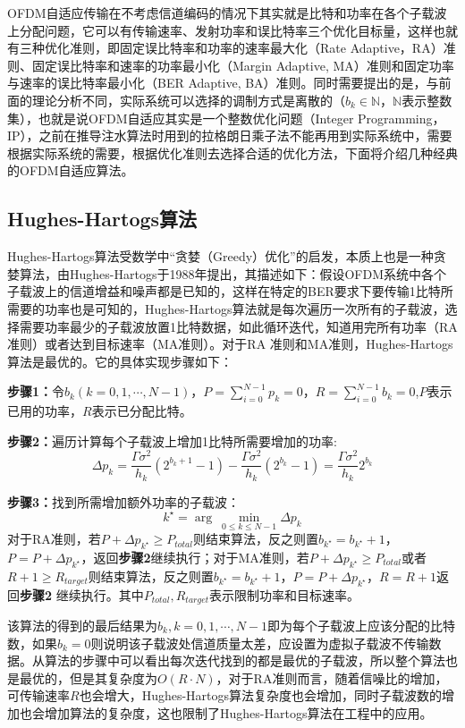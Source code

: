 OFDM自适应传输在不考虑信道编码的情况下其实就是比特和功率在各个子载波上分配问题，它可以有传输速率、发射功率和误比特率三个优化目标量，这样也就有三种优化准则，即固定误比特率和功率的速率最大化（Rate Adaptive，RA）准则、固定误比特率和速率的功率最小化（Margin Adaptive, MA）准则和固定功率与速率的误比特率最小化（BER Adaptive, BA）准则。同时需要提出的是，与前面的理论分析不同，实际系统可以选择的调制方式是离散的（$b_k \in \mathbb{N}$，$\mathbb{N}$表示整数集），也就是说OFDM自适应其实是一个整数优化问题（Integer Programming，IP），之前在推导注水算法时用到的拉格朗日乘子法不能再用到实际系统中，需要根据实际系统的需要，根据优化准则去选择合适的优化方法，下面将介绍几种经典的OFDM自适应算法。
\subsection{Hughes-Hartogs算法}
Hughes-Hartogs算法\cite{hughes1989ensemble}受数学中“贪婪（Greedy）优化”的启发，本质上也是一种贪婪算法，由Hughes-Hartogs于1988年提出，其描述如下：假设OFDM系统中各个子载波上的信道增益和噪声都是已知的，这样在特定的BER要求下要传输1比特所需要的功率也是可知的，Hughes-Hartogs算法就是每次遍历一次所有的子载波，选择需要功率最少的子载波放置1比特数据，如此循环迭代，知道用完所有功率（RA准则）或者达到目标速率（MA准则）。对于RA 准则和MA准则，Hughes-Hartogs算法是最优的。它的具体实现步骤如下：
\begin{description}
\item{\bf{步骤1：}}令$b_k(k=0,1,\cdots,N-1)$，$P=\sum_{i=0}^{N-1}p_k=0$，$R=\sum_{i=0}^{N-1}b_k=0$,$P$表示已用的功率，$R$表示已分配比特。
\item{\bf{步骤2：}}遍历计算每个子载波上增加1比特所需要增加的功率:
\begin{equation}
\Delta p_k=\frac{\Gamma\sigma^2}{h_k}(2^{b_k+1}-1)-\frac{\Gamma\sigma^2}{h_k}(2^{b_k}-1)=\frac{\Gamma\sigma^2}{h_k}2^{b_k}
\end{equation}
\item{\bf{步骤3：}}找到所需增加额外功率的子载波：
\begin{equation}
k^{\star} = \arg\ \underset{0\leq k \leq N-1}{\min}\Delta p_k
\end{equation}
对于RA准则，若$P+\Delta p_{k^\star}\geq P_{total}$则结束算法，反之则置$b_{k^\star}=b_{k^\star}+1$，$P=P+\Delta p_{k^\star}$，返回\textbf{步骤2}继续执行；对于MA准则，若$P+\Delta p_{k^\star}\geq P_{total}$或者$R+1\geq R_{target}$则结束算法，反之则置$b_{k^\star}=b_{k^\star}+1$，$P=P+\Delta p_{k^\star}$，$R=R+1$返回\textbf{步骤2} 继续执行。其中$P_{total}, R_{target}$表示限制功率和目标速率。
\end{description}
该算法的得到的最后结果为$b_k, k=0,1,\cdots,N-1$即为每个子载波上应该分配的比特数，如果$b_k=0$则说明该子载波处信道质量太差，应设置为虚拟子载波不传输数据。从算法的步骤中可以看出每次迭代找到的都是最优的子载波，所以整个算法也是最优的，但是其复杂度为$O(R\cdot N)$，对于RA准则而言，随着信噪比的增加，可传输速率$R$也会增大，Hughes-Hartogs算法复杂度也会增加，同时子载波数的增加也会增加算法的复杂度，这也限制了Hughes-Hartogs算法在工程中的应用。
